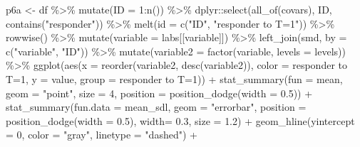 \documentclass[
  letterpaper,
  DIV=11,
  numbers=noendperiod]{scrreprt}
\newenvironment{Shaded}{\begin{snugshade}}{\end{snugshade}}
\newcommand{\AttributeTok}[1]{\textcolor[rgb]{0.40,0.45,0.13}{#1}}
\newcommand{\DecValTok}[1]{\textcolor[rgb]{0.68,0.00,0.00}{#1}}
\newcommand{\FloatTok}[1]{\textcolor[rgb]{0.68,0.00,0.00}{#1}}
\newcommand{\FunctionTok}[1]{\textcolor[rgb]{0.28,0.35,0.67}{#1}}
\newcommand{\NormalTok}[1]{\textcolor[rgb]{0.00,0.23,0.31}{#1}}
\newcommand{\OtherTok}[1]{\textcolor[rgb]{0.00,0.23,0.31}{#1}}
\newcommand{\SpecialCharTok}[1]{\textcolor[rgb]{0.37,0.37,0.37}{#1}}
\newcommand{\StringTok}[1]{\textcolor[rgb]{0.13,0.47,0.30}{#1}}
\begin{document}
\begin{Shaded}
\begin{Highlighting}[]
\NormalTok{p6a }\OtherTok{\textless{}{-}}\NormalTok{ df }\SpecialCharTok{\%\textgreater{}\%}
  \FunctionTok{mutate}\NormalTok{(}\AttributeTok{ID =} \DecValTok{1}\SpecialCharTok{:}\FunctionTok{n}\NormalTok{()) }\SpecialCharTok{\%\textgreater{}\%}
\NormalTok{  dplyr}\SpecialCharTok{::}\FunctionTok{select}\NormalTok{(}\FunctionTok{all\_of}\NormalTok{(covars), ID, }\FunctionTok{contains}\NormalTok{(}\StringTok{"responder"}\NormalTok{)) }\SpecialCharTok{\%\textgreater{}\%}
  \FunctionTok{melt}\NormalTok{(}\AttributeTok{id =} \FunctionTok{c}\NormalTok{(}\StringTok{"ID"}\NormalTok{, }\StringTok{"responder to T=1"}\NormalTok{)) }\SpecialCharTok{\%\textgreater{}\%}
  \FunctionTok{rowwise}\NormalTok{() }\SpecialCharTok{\%\textgreater{}\%}
  \FunctionTok{mutate}\NormalTok{(}\AttributeTok{variable =}\NormalTok{ labs[[variable]]) }\SpecialCharTok{\%\textgreater{}\%}
  \FunctionTok{left\_join}\NormalTok{(smd, }\AttributeTok{by =} \FunctionTok{c}\NormalTok{(}\StringTok{"variable"}\NormalTok{, }\StringTok{"ID"}\NormalTok{)) }\SpecialCharTok{\%\textgreater{}\%}
  \FunctionTok{mutate}\NormalTok{(}\AttributeTok{variable2 =} \FunctionTok{factor}\NormalTok{(variable, }\AttributeTok{levels =}\NormalTok{ levels)) }\SpecialCharTok{\%\textgreater{}\%}
  \FunctionTok{ggplot}\NormalTok{(}\FunctionTok{aes}\NormalTok{(}\AttributeTok{x =} \FunctionTok{reorder}\NormalTok{(variable2, }\FunctionTok{desc}\NormalTok{(variable2)), }\AttributeTok{color =} \StringTok{\textasciigrave{}}\AttributeTok{responder to T=1}\StringTok{\textasciigrave{}}\NormalTok{, }\AttributeTok{y =}\NormalTok{ value, }\AttributeTok{group =} \StringTok{\textasciigrave{}}\AttributeTok{responder to T=1}\StringTok{\textasciigrave{}}\NormalTok{)) }\SpecialCharTok{+}
  \FunctionTok{stat\_summary}\NormalTok{(}\AttributeTok{fun =}\NormalTok{ mean, }\AttributeTok{geom =} \StringTok{"point"}\NormalTok{, }\AttributeTok{size =} \DecValTok{4}\NormalTok{, }\AttributeTok{position =} \FunctionTok{position\_dodge}\NormalTok{(}\AttributeTok{width =} \FloatTok{0.5}\NormalTok{)) }\SpecialCharTok{+}
  \FunctionTok{stat\_summary}\NormalTok{(}\AttributeTok{fun.data =}\NormalTok{ mean\_sdl, }\AttributeTok{geom =} \StringTok{"errorbar"}\NormalTok{, }\AttributeTok{position =} \FunctionTok{position\_dodge}\NormalTok{(}\AttributeTok{width =} \FloatTok{0.5}\NormalTok{), }\AttributeTok{width=} \FloatTok{0.3}\NormalTok{, }\AttributeTok{size =} \FloatTok{1.2}\NormalTok{) }\SpecialCharTok{+}
  \FunctionTok{geom\_hline}\NormalTok{(}\AttributeTok{yintercept =} \DecValTok{0}\NormalTok{, }\AttributeTok{color =} \StringTok{"gray"}\NormalTok{, }\AttributeTok{linetype =} \StringTok{"dashed"}\NormalTok{) }\SpecialCharTok{+}

\end{Highlighting}
\end{Shaded}
\end{document}
